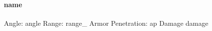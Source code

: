 \ \\
{{\bf {name} }} \\
\ \\
Angle: {angle} Range: {range_} Armor Penetration: {ap} Damage {damage} \\
 \\



